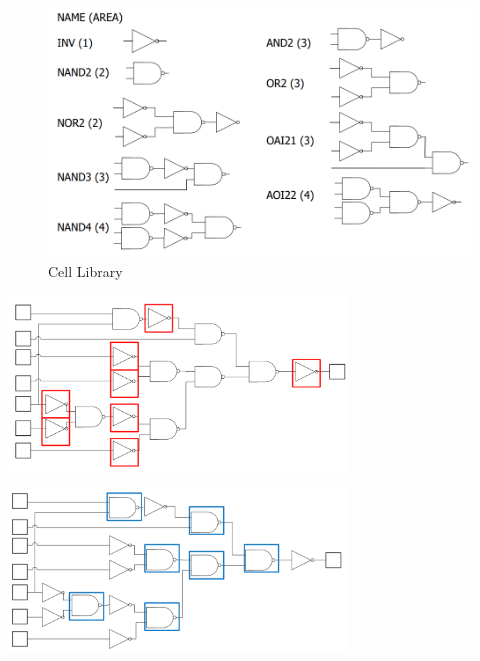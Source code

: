 \documentclass{article}
\begin{document}
\begin{figure}[htp]
    \centering
    \includegraphics[width=13cm, scale=1]{S4/pattern_library.PNG}
    \caption{Cell Library}
\end{figure}

\begin{minipage}[t]{0.5\textwidth}
    \centering
    \includegraphics[width=9cm, scale=1]{S4/inv_pattern.PNG}
    \captionsetup{justification=centering}
\end{minipage}%
\begin{minipage}[t]{0.5\textwidth}
    \centering
    \includegraphics[width=9cm, scale=1]{S4/nand2_pattern.PNG}
    \captionsetup{justification=centering}
\end{minipage}%
\end{document}
